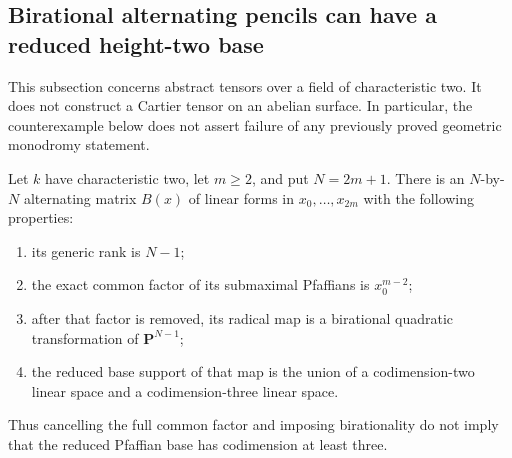 \subsection{Birational alternating pencils can have a reduced height-two base}
\label{subsec:abstract-Pfaffian-height-two-countermodel}

This subsection concerns abstract tensors over a field of characteristic
two.  It does not construct a Cartier tensor on an abelian surface.
In particular, the counterexample below does not assert failure of any
previously proved geometric monodromy statement.

\begin{proposition}
\label{prop:abstract-birational-Pfaffian-height-two}
Let \(k\) have characteristic two, let \(m\ge2\), and put \(N=2m+1\).
There is an \(N\)-by-\(N\) alternating matrix \(B(x)\) of linear
forms in \(x_0,\ldots,x_{2m}\) with the following properties:
\begin{enumerate}
\item its generic rank is \(N-1\);
\item the exact common factor of its submaximal Pfaffians is
      \(x_0^{m-2}\);
\item after that factor is removed, its radical map is a birational
      quadratic transformation of \(\mathbf P^{N-1}\);
\item the reduced base support of that map is the union of a
      codimension-two linear space and a codimension-three linear space.
\end{enumerate}
Thus cancelling the full common factor and imposing birationality do
not imply that the reduced Pfaffian base has codimension at least three.
\end{proposition}
